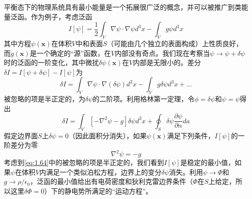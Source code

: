 \documentclass[12pt]{book}
\numberwithin{equation}{chapter}
\numberwithin{figure}{chapter}
\numberwithin{footnote}{page}
\begin{document}
平衡态下的物理系统具有最小能量是一个拓展很广泛的概念，并可以被推广到类能量泛函。作为例子，考虑泛函
\begin{equation}\label{eq:1.63}
    I[\psi]=\frac{1}{2}\int_V \nabla\psi\cdot\nabla\psi d^3x-\int_V g\psi d^3x
\end{equation}
其中方程$\psi(\mathbf{x})$在体积$V$中和表面$S$（可能由几个独立的表面构成）上性质良好，而$g(\mathbf{x})$是一个确定的“源”函数，在$V$内部没有奇点。我们现在考察当$\psi\to\psi+\delta\psi$时的泛函的一阶变化，其中微扰$\delta\psi(\mathbf{x})$在$V$内部是无限小的。差分$\delta I=I[\psi+\delta \psi]-I[\psi]$为
\begin{equation}\label{eq:1.64}
    \delta I=\int_V \nabla\psi\cdot\nabla(\delta\psi)d^3x-\int_V g\delta\psi d^3x+\dots
\end{equation}
被忽略的项是半正定的，为$\delta\psi$的二阶项。利用格林第一定理，令$\phi=\delta\psi$和$\psi=\psi$得出
\begin{equation}\label{eq:1.65}
    \delta I=\int_V [-\nabla^2 \psi-g]\delta\psi d^3x+\oint_S \delta\psi\frac{\partial \psi}{\partial n}da
\end{equation}
假定边界面$S$上$\delta\psi=0$（因此面积分消失），如果$\psi(\mathbf{x})$满足下列条件，$I[\psi]$的一阶差分为零
\begin{equation}\label{eq:1.66}
    \nabla^2\psi=-g
\end{equation}
考虑到\autoref{eq:1.64}中的被忽略的项是半正定的，我们看到$I[\psi]$是稳定的最小值，如果$\psi$在体积$V$内满足一个类似泊松方程，边界上的变分$\delta\psi$消失。利用$\psi\to\Phi$和$g\to \rho/\epsilon_0$，泛函的最小值给出有电荷密度和狄利克雷边界条件（$\Phi$在$S$上给定，所以这里$\delta\Phi=0$）下的静电势所满足的“运动方程”。
\end{document}
